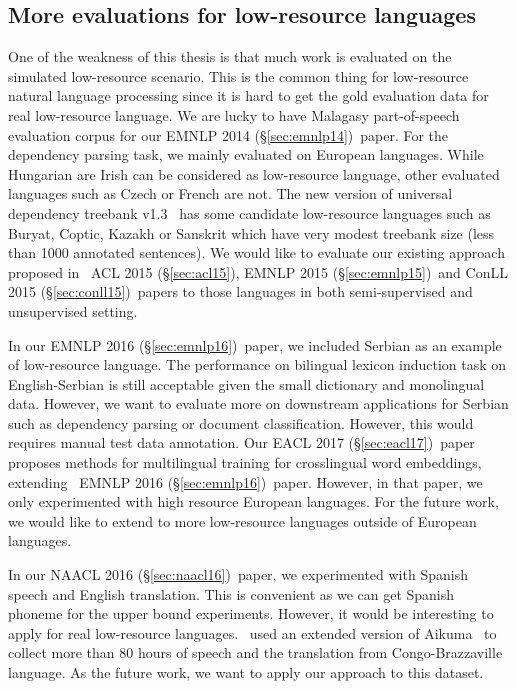 \documentclass[12pt,twoside,final,hidelinks]{ltthesis}
\theoremstyle{definition}
\newcommand\emnlpiv{EMNLP 2014 (\S\ref{sec:emnlp14})}
\newcommand\conllv{ConLL 2015 (\S\ref{sec:conll15})}
\newcommand\aclv{ACL 2015 (\S\ref{sec:acl15})}
\newcommand\emnlpv{EMNLP 2015 (\S\ref{sec:emnlp15})}
\newcommand\naaclvi{NAACL 2016 (\S\ref{sec:naacl16})}
\newcommand\emnlpvi{EMNLP 2016 (\S\ref{sec:emnlp16})}
\newcommand\eaclvii{EACL 2017 (\S\ref{sec:eacl17})}
\begin{document}
\subsection{More evaluations for low-resource languages} 
One of the weakness of this thesis is that much work is evaluated on the simulated low-resource scenario. 
This is the common thing for low-resource natural language processing since it is hard to get the gold evaluation data 
for real low-resource language. We are lucky to have Malagasy part-of-speech evaluation corpus for our \emnlpiv\ paper. 
For the dependency parsing task, we mainly evaluated on European languages. While Hungarian are Irish can be considered as  
low-resource language, other evaluated languages such as Czech or French are not. The new version of universal dependency 
treebank v1.3~\cite{11234/1-1699} has some candidate low-resource languages such as Buryat, Coptic, Kazakh or Sanskrit
which have very modest treebank size (less than 1000 annotated sentences). We would like to evaluate our existing approach 
proposed in ~\aclv, \emnlpv\ and \conllv\ papers to those languages in both semi-supervised and unsupervised setting. 

In our \emnlpvi\ paper, we included Serbian as an example of low-resource language. The performance on bilingual lexicon induction 
task on English-Serbian is still acceptable given the small dictionary and monolingual data. However, we want to evaluate more 
on downstream applications for Serbian such as dependency parsing or document classification. However, this would requires manual 
test data annotation. Our \eaclvii\ paper proposes methods for multilingual training for crosslingual word embeddings, extending 
~\emnlpvi\ paper. However, in that paper, we only experimented with high resource European languages. For the future work, we would 
like to extend to more low-resource languages outside of European languages. 

In our \naaclvi\ paper, we experimented with Spanish speech and English translation. This is convenient as we can get Spanish phoneme 
for the upper bound experiments. However, it would be interesting to apply for real low-resource languages.~ used 
an extended version of Aikuma~\cite{bird-EtAl:2014:W14-22} to collect more than 80 hours of speech and the translation from Congo-Brazzaville
language. As the future work, we want to apply our approach to this dataset. 
\end{document}
